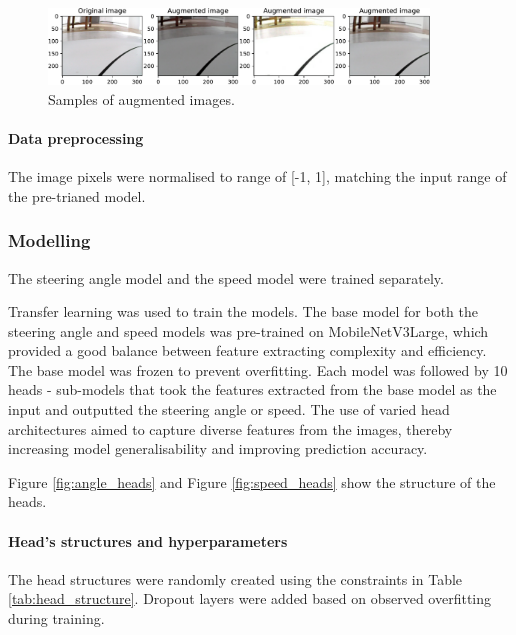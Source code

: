 \documentclass{article}
\begin{document}
\begin{figure}[h]
  \centering
  \includegraphics[width=0.9\textwidth]{figures/augmentation.pdf}
  \caption{Samples of augmented images.}
  \label{fig:augmentation}
\end{figure}

\paragraph{Data preprocessing}
\label{sec:data_preprocessing}
The image pixels were normalised to range of [-1, 1], matching the input range of the pre-trianed model.

\subsubsection{Modelling}
The steering angle model and the speed model were trained separately.

Transfer learning was used to train the models. The base model for both the steering angle and speed models was pre-trained on MobileNetV3Large, which provided a good balance between feature extracting complexity and efficiency. The base model was frozen to prevent overfitting. Each model was followed by 10 heads - sub-models that took the features extracted from the base model as the input and outputted the steering angle or speed. The use of varied head architectures aimed to capture diverse features from the images, thereby increasing model generalisability and improving prediction accuracy.

Figure \ref{fig:angle_heads} and Figure \ref{fig:speed_heads} show the structure of the heads.

\paragraph{Head's structures and hyperparameters}
\label{sec:structures_and_hyperparameters}

The head structures were randomly created using the constraints in Table \ref{tab:head_structure}. Dropout layers were added based on observed overfitting during training.
\end{document}
